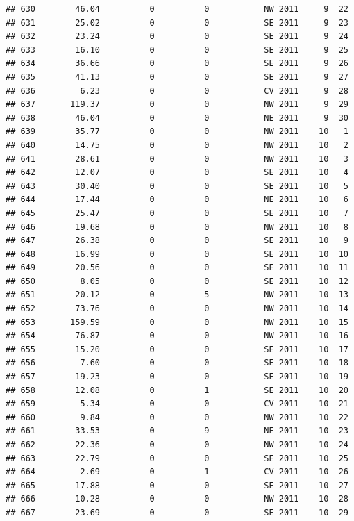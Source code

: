 \documentclass[
]{article}
\begin{document}
\begin{verbatim}
## 630        46.04          0          0           NW 2011     9  22
## 631        25.02          0          0           SE 2011     9  23
## 632        23.24          0          0           SE 2011     9  24
## 633        16.10          0          0           SE 2011     9  25
## 634        36.66          0          0           SE 2011     9  26
## 635        41.13          0          0           SE 2011     9  27
## 636         6.23          0          0           CV 2011     9  28
## 637       119.37          0          0           NW 2011     9  29
## 638        46.04          0          0           NE 2011     9  30
## 639        35.77          0          0           NW 2011    10   1
## 640        14.75          0          0           NW 2011    10   2
## 641        28.61          0          0           NW 2011    10   3
## 642        12.07          0          0           SE 2011    10   4
## 643        30.40          0          0           SE 2011    10   5
## 644        17.44          0          0           NE 2011    10   6
## 645        25.47          0          0           SE 2011    10   7
## 646        19.68          0          0           NW 2011    10   8
## 647        26.38          0          0           SE 2011    10   9
## 648        16.99          0          0           SE 2011    10  10
## 649        20.56          0          0           SE 2011    10  11
## 650         8.05          0          0           SE 2011    10  12
## 651        20.12          0          5           NW 2011    10  13
## 652        73.76          0          0           NW 2011    10  14
## 653       159.59          0          0           NW 2011    10  15
## 654        76.87          0          0           NW 2011    10  16
## 655        15.20          0          0           SE 2011    10  17
## 656         7.60          0          0           SE 2011    10  18
## 657        19.23          0          0           SE 2011    10  19
## 658        12.08          0          1           SE 2011    10  20
## 659         5.34          0          0           CV 2011    10  21
## 660         9.84          0          0           NW 2011    10  22
## 661        33.53          0          9           NE 2011    10  23
## 662        22.36          0          0           NW 2011    10  24
## 663        22.79          0          0           SE 2011    10  25
## 664         2.69          0          1           CV 2011    10  26
## 665        17.88          0          0           SE 2011    10  27
## 666        10.28          0          0           NW 2011    10  28
## 667        23.69          0          0           SE 2011    10  29

\end{verbatim}
\end{document}
